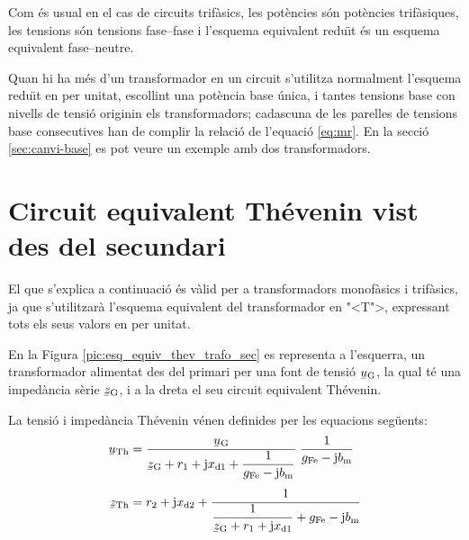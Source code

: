 Com \'{e}s usual en el cas de circuits trif\`{a}sics, les pot\`{e}ncies s\'{o}n  pot\`{e}ncies trif\`{a}siques,  les tensions s\'{o}n  tensions fase--fase i l'esquema equivalent redu\"{\i}t \'{e}s un esquema equivalent fase--neutre.

Quan hi ha m\'{e}s d'un transformador en un circuit s'utilitza normalment l'esquema redu\"{\i}t en per unitat, escollint una pot\`{e}ncia base \'{u}nica, i tantes tensions base con nivells de tensi\'{o}  originin els transformadors; cadascuna de les parelles de tensions base consecutives han de complir la relaci\'{o} de l'equaci\'{o} \eqref{eq:mr}. En la secci\'{o} \vref{sec:canvi-base} es pot veure un exemple amb dos transformadors.

\section{Circuit equivalent Th\'{e}venin vist des del secundari}\label{sec:trafo-thevenin}

El que s'explica a continuaci\'{o} \'{e}s v\`{a}lid per a transformadors
monof\`{a}sics i trif\`{a}sics, ja que s'utilitzar\`{a} l'esquema equivalent del
transformador en {"<}T{">}, expressant tots els seus valors en per unitat.

En la Figura \vref{pic:esq_equiv_thev_trafo_sec}  es representa a
l'esquerra, un transformador alimentat des del primari per una font
de tensi\'{o} $\cmplx{u}\ped{G}$, la qual t\'{e} una imped\`{a}ncia s\`{e}rie
$\cmplx{z}\ped{G}$, i a  la dreta el seu circuit equivalent
Th\'{e}venin.

\begin{center}
    
    \label{pic:esq_equiv_thev_trafo_sec}
\end{center}

La tensi\'{o} i imped\`{a}ncia Th\'{e}venin v\'{e}nen definides per les equacions
seg\"{u}ents:
\begin{align}
    \cmplx{u}\ped{Th} &= \frac{\cmplx{u}\ped{G}}{\cmplx{z}\ped{G} + r_1 + \ju
    x\ped{d1} + \dfrac{1}{g\ped{Fe}-\ju b\ped{m}}} \;\frac{1}{g\ped{Fe}-\ju
    b\ped{m}} \label{eq:trafo_uth}\\[1ex]
    \cmplx{z}\ped{Th} &= r_2 + \ju x\ped{d2} + \frac{1}{\dfrac{1}{\cmplx{z}\ped{G} + r_1 +
    \ju x\ped{d1}} + g\ped{Fe}-\ju b\ped{m}}\label{eq:trafo_zth}
\end{align}

